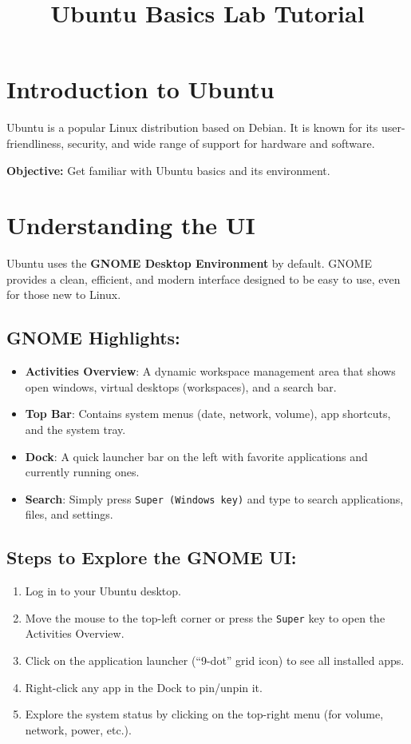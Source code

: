 \documentclass[12pt]{article}
\title{\textbf{Ubuntu Basics Lab Tutorial}}
\author{}
\date{}
\begin{document}
\maketitle

\section{Introduction to Ubuntu}
Ubuntu is a popular Linux distribution based on Debian. It is known for its user-friendliness, security, and wide range of support for hardware and software.

\textbf{Objective:} Get familiar with Ubuntu basics and its environment.

\section{Understanding the UI}

Ubuntu uses the \textbf{GNOME Desktop Environment} by default. GNOME provides a clean, efficient, and modern interface designed to be easy to use, even for those new to Linux.

\subsection*{GNOME Highlights:}
\begin{itemize}
    \item \textbf{Activities Overview}: A dynamic workspace management area that shows open windows, virtual desktops (workspaces), and a search bar.
    \item \textbf{Top Bar}: Contains system menus (date, network, volume), app shortcuts, and the system tray.
    \item \textbf{Dock}: A quick launcher bar on the left with favorite applications and currently running ones.
    \item \textbf{Search}: Simply press \texttt{Super (Windows key)} and type to search applications, files, and settings.
\end{itemize}

\subsection*{Steps to Explore the GNOME UI:}
\begin{enumerate}
    \item Log in to your Ubuntu desktop.
    \item Move the mouse to the top-left corner or press the \texttt{Super} key to open the Activities Overview.
    \item Click on the application launcher (``9-dot'' grid icon) to see all installed apps.
    \item Right-click any app in the Dock to pin/unpin it.
    \item Explore the system status by clicking on the top-right menu (for volume, network, power, etc.).
\end{enumerate}
\end{document}
